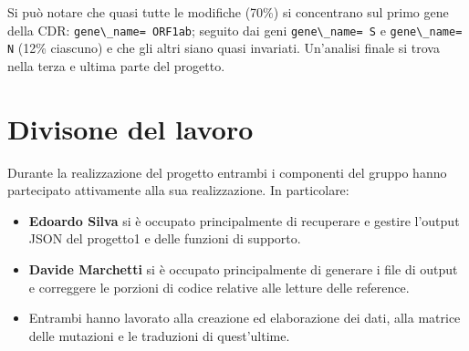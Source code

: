 \documentclass[11pt,italian]{article}
\begin{document}
Si può notare che quasi tutte le modifiche (70\%) si concentrano sul primo gene della CDR: \lstinline{gene\_name= ORF1ab}; seguito dai geni \lstinline{gene\_name= S} e \lstinline{gene\_name= N} (12\% ciascuno) e che gli altri siano quasi invariati.
Un'analisi finale si trova nella terza e ultima parte del progetto.

\newpage
\section{Divisone del lavoro}
Durante la realizzazione del progetto entrambi i componenti del gruppo hanno partecipato attivamente alla sua realizzazione. In particolare:
\begin{itemize}
  \item \textbf{Edoardo Silva} si è occupato principalmente di recuperare e gestire l'output JSON del progetto1 e delle funzioni di supporto.
  \item \textbf{Davide Marchetti} si è occupato principalmente di generare i file di output e correggere le porzioni di codice relative alle letture delle reference.
  \item Entrambi hanno lavorato alla creazione ed elaborazione dei dati, alla matrice delle mutazioni e le traduzioni di quest'ultime.
\end{itemize}
\end{document}
